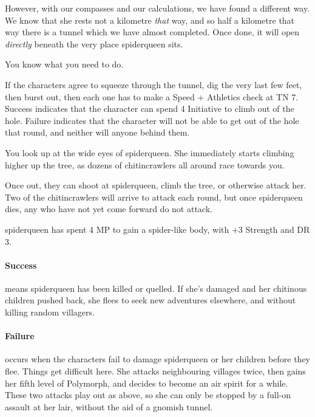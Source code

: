 \begin{multicols}{2}
\begin{speechtext}
	However, with our compasses and our calculations, we have found a different way.
	We know that she rests not a kilometre \emph{that} way, and so half a kilometre that way there is a tunnel which we have almost completed.
	Once done, it will open \emph{directly} beneath the very place \gls{spiderqueen} sits.

	You know what you need to do.

\end{speechtext}

If the characters agree to squeeze through the tunnel, dig the very last few feet, then burst out, then each one has to make a Speed + Athletics check at TN 7.  Success indicates that the character can spend 4 Initiative to climb out of the hole.  Failure indicates that the character will not be able to get out of the hole that round, and neither will anyone behind them.

\begin{boxtext}

	You look up at the wide eyes of \gls{spiderqueen}. She immediately starts climbing higher up the tree, as dozens of chitincrawlers all around race towards you.

\end{boxtext}

Once out, they can shoot at \gls{spiderqueen}, climb the tree, or otherwise attack her.  Two of the chitincrawlers will arrive to attack each round, but once \gls{spiderqueen} dies, any who have not yet come forward do not attack.

\keras



\spiderqueen

\Gls{spiderqueen} has spent 4 MP to gain a spider-like body, with +3 Strength and DR 3.


\paragraph{Success} means \gls{spiderqueen} has been killed or quelled.
If she's damaged and her chitinous children pushed back, she flees to seek new adventures elsewhere, and without killing random villagers.

\paragraph{Failure} occurs when the characters fail to damage \gls{spiderqueen} or her children before they flee.
Things get difficult here.
She attacks neighbouring villages twice, then gains her fifth level of Polymorph, and decides to become an air spirit for a while.
These two attacks play out as above, so she can only be stopped by a full-on assault at her lair, without the aid of a gnomish tunnel.


\end{multicols}
